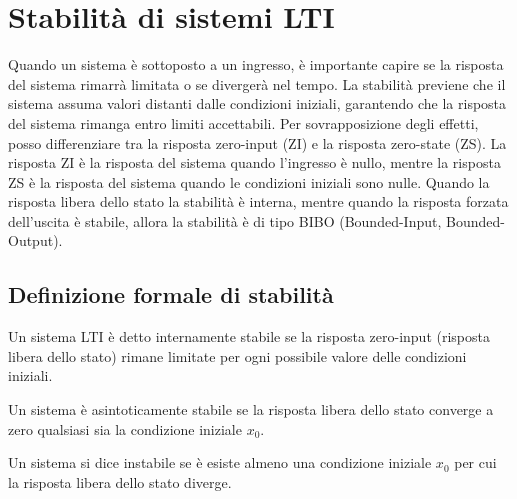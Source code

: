 \section{Stabilità di sistemi LTI}
Quando un sistema è sottoposto a un ingresso, è importante capire se la
risposta del sistema rimarrà limitata o se divergerà nel tempo. La stabilità
previene che il sistema assuma valori distanti dalle condizioni iniziali,
garantendo che la risposta del sistema rimanga entro limiti accettabili. Per
sovrapposizione degli effetti, posso differenziare tra la risposta zero-input
(ZI) e la risposta zero-state (ZS). La risposta ZI è la risposta del sistema
quando l'ingresso è nullo, mentre la risposta ZS è la risposta del sistema
quando le condizioni iniziali sono nulle. Quando la risposta libera dello stato
la stabilità è interna, mentre quando la risposta forzata dell'uscita è
stabile, allora la stabilità è di tipo BIBO (Bounded-Input, Bounded-Output).
\subsection{Definizione formale di stabilità}
\begin{tcolorbox}[title=Sistema internamente stabile, colback=blue!5!white,colframe=blue!75!black]
    Un sistema LTI è detto internamente stabile se la risposta zero-input
    (risposta libera dello stato) rimane limitate per ogni possibile valore
    delle condizioni iniziali.
\end{tcolorbox}
\begin{tcolorbox}[title=Sistema asintoticamente stabile, colback=green!5!white,colframe=green!75!black]
    Un sistema è asintoticamente stabile se la risposta libera dello stato
    converge a zero qualsiasi sia la condizione iniziale $x_0$.

\end{tcolorbox}
\begin{tcolorbox}[title=Sistema instabile, colback=red!5!white,colframe=red!75!black]
    Un sistema si dice instabile se è esiste almeno una condizione iniziale
    $x_0$ per cui la risposta libera dello stato diverge.
\end{tcolorbox}

